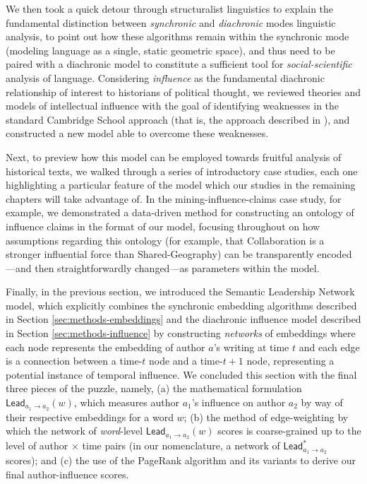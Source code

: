 \documentclass[11pt]{article}
\begin{document}
We then took a quick detour through structuralist linguistics to explain the fundamental distinction between \textit{synchronic} and \textit{diachronic} modes linguistic analysis, to point out how these algorithms remain within the synchronic mode (modeling language as a single, static geometric space), and thus need to be paired with a diachronic model to constitute a sufficient tool for \textit{social-scientific} analysis of language. Considering \textit{influence} as the fundamental diachronic relationship of interest to historians of political thought, we reviewed theories and models of intellectual influence with the goal of identifying weaknesses in the standard Cambridge School approach (that is, the approach described in \cite{skinner_meaning_1969}), and constructed a new model able to overcome these weaknesses.

Next, to preview how this model can be employed towards fruitful analysis of historical texts, we walked through a series of introductory case studies, each one highlighting a particular feature of the model which our studies in the remaining chapters will take advantage of. In the mining-influence-claims case study, for example, we demonstrated a data-driven method for constructing an ontology of influence claims in the format of our model, focusing throughout on how assumptions regarding this ontology (for example, that \textsf{Collaboration} is a stronger influential force than \textsf{Shared-Geography}) can be transparently encoded---and then straightforwardly changed---as parameters within the model.

Finally, in the previous section, we introduced the Semantic Leadership Network model, which explicitly combines the synchronic embedding algorithms described in Section \ref{sec:methods-embeddings} and the diachronic influence model described in Section \ref{sec:methods-influence} by constructing \textit{networks} of embeddings where each node represents the embedding of author $a$'s writing at time $t$ and each edge is a connection between a time-$t$ node and a time-$t+1$ node, representing a potential instance of temporal influence. We concluded this section with the final three pieces of the puzzle, namely, (a) the mathematical formulation $\textsf{Lead}_{a_1 \rightarrow a_2}(w)$, which measures author $a_1$'s influence on author $a_2$ by way of their respective embeddings for a word $w$; (b) the method of edge-weighting by which the network of \textit{word}-level $\textsf{Lead}_{a_1 \rightarrow a_2}(w)$ scores is coarse-grained up to the level of author $\times$ time pairs (in our nomenclature, a network of $\textsf{Lead}^*_{a_1 \rightarrow a_2}$ scores); and (c) the use of the PageRank algorithm and its variants to derive our final author-influence scores.
\end{document}
